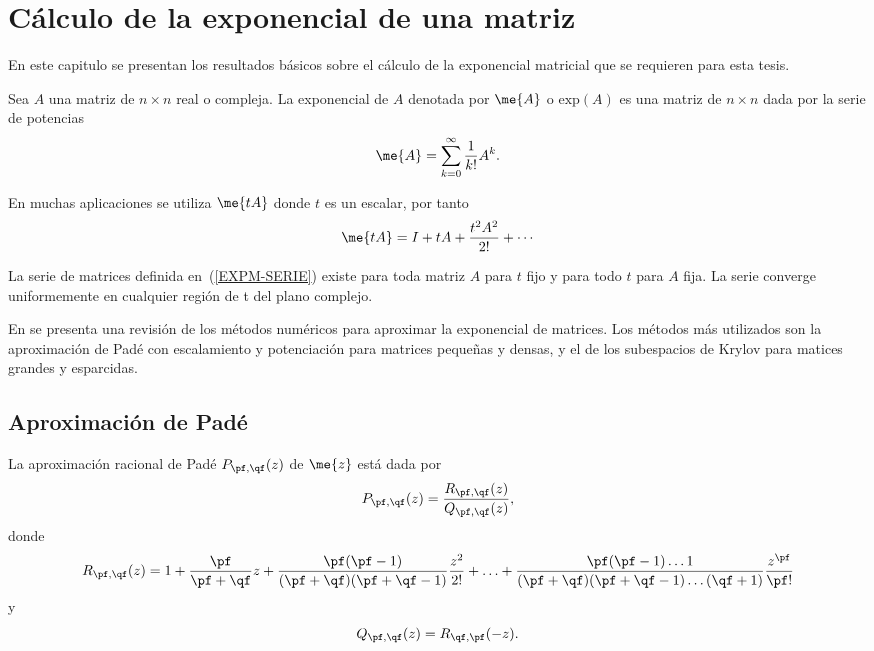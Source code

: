 \chapter{C\'{a}lculo de la exponencial de una  matriz}\label{chapter:EXPM-Krylov}

En este capitulo se presentan los resultados básicos sobre el c\'{a}lculo de la exponencial matricial que se requieren para esta tesis.

\begin{definition}
    \label{EXPM}\cite{Golub96} Sea $A$ una matriz de $n\times n$ real o compleja. La exponencial de $A$ denotada por 
    $ \me{A} $ o $\mathrm{exp}(A)$ es una matriz de $n\times n$ dada por la serie de potencias
    \[\me{A}=\sum_{k=0}^{\infty}\frac{1}{k!}A^{k}.\]
\end{definition}
En muchas aplicaciones se utiliza $\me{tA}$ donde $t$ es un escalar, por tanto 
\begin{equation}
\me{tA}=I+tA+\frac{t^{2}A^{2}}{2!}+\cdots\label{EXPM-SERIE}
\end{equation}
\begin{theorem}\cite{IntroMatrix}
    La serie de matrices definida en~(\ref{EXPM-SERIE}) existe para toda matriz $A$ para $t$ fijo y
    para todo $t$ para $A$ fija. La serie converge uniformemente en cualquier regi\'on de t del plano complejo.
\end{theorem}

En \cite{VanLoan03} se presenta una revisi\'on de los m\'etodos num\'ericos
para aproximar
la exponencial de matrices. Los m\'etodos m\'as utilizados son la aproximaci\'on de Pad\'e con escalamiento
y potenciaci\'on para matrices peque\~nas y densas, y el de los subespacios de Krylov para matices grandes y esparcidas. 

\section{Aproximaci\'on de Pad\'e}

\begin{definition}
    \cite{Golub96} La aproximaci\'{o}n racional de Pad\'{e} $P_{\pf,\qf}(z)$
    de $\me{z}$ est\'{a} dada por 
    \begin{equation*}
    P_{\pf,\qf}(z)=\dfrac{R_{\pf,\qf}(z)}{Q_{\pf,\qf}(z)},  \label{FORM PADE}
    \end{equation*}%
    donde 
    \[
    R_{\pf,\qf}(z)=1+\dfrac{\pf}{\pf+\qf}z+\dfrac{\pf(\pf-1)}{(\pf+\qf)(\pf+\qf-1)}\dfrac{z^{2}}{2!}%
    +\ldots +\frac{\pf(\pf-1)\ldots 1}{(\pf+\qf)(\pf+\qf-1)\ldots (\qf+1)}\dfrac{z^{\pf}}{\pf!}
    \]%
    y 
    \[
    Q_{\pf,\qf}(z)=R_{\qf,\pf}(-z).
    \]
\end{definition}

